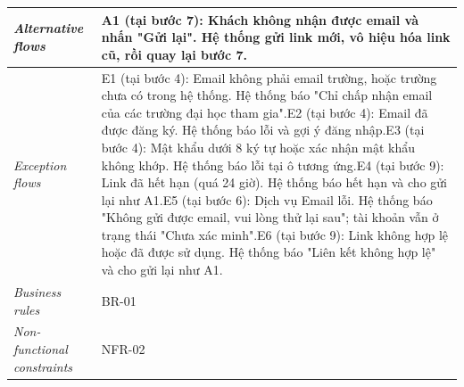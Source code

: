 \begin{longtable}[]{@{}|>{\raggedright\arraybackslash}p{}|>{\raggedright\arraybackslash}p{}|@{}}
\emph{Alternative flows} & A1 (tại bước 7): Khách không nhận được email và nhấn "Gửi lại". Hệ thống gửi link mới, vô hiệu hóa link cũ, rồi quay lại bước 7. \\ \hline
\emph{Exception flows} & E1 (tại bước 4): Email không phải email trường, hoặc trường chưa có trong hệ thống. Hệ thống báo "Chỉ chấp nhận email của các trường đại học tham gia".\newline E2 (tại bước 4): Email đã được đăng ký. Hệ thống báo lỗi và gợi ý đăng nhập.\newline E3 (tại bước 4): Mật khẩu dưới 8 ký tự hoặc xác nhận mật khẩu không khớp. Hệ thống báo lỗi tại ô tương ứng.\newline E4 (tại bước 9): Link đã hết hạn (quá 24 giờ). Hệ thống báo hết hạn và cho gửi lại như A1.\newline E5 (tại bước 6): Dịch vụ Email lỗi. Hệ thống báo "Không gửi được email, vui lòng thử lại sau"; tài khoản vẫn ở trạng thái "Chưa xác minh".\newline E6 (tại bước 9): Link không hợp lệ hoặc đã được sử dụng. Hệ thống báo "Liên kết không hợp lệ" và cho gửi lại như A1. \\ \hline
\emph{Business rules} & BR-01 \\ \hline
\emph{Non-functional constraints} & NFR-02 \\ \hline
\end{longtable}
